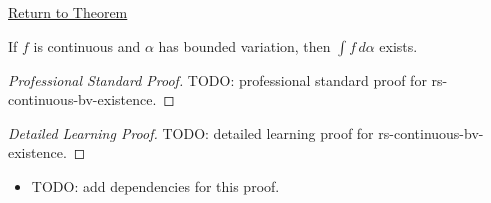 \newpage
{}
\label{prf:rs-continuous-bv-existence}
\begin{remark*}[Return]\hyperref[thm:rs-continuous-bv-existence]{Return to Theorem}\end{remark*}

\begin{theorem*}
If \(f\) is continuous and \(\alpha\) has bounded variation, then \(\int f\,d\alpha\) exists.
\end{theorem*}

\begin{proof}[Professional Standard Proof]
\LRAProofBodyStart
TODO: professional standard proof for rs-continuous-bv-existence.
\end{proof}

\begin{proof}[Detailed Learning Proof]
\LRAProofBodyStart
TODO: detailed learning proof for rs-continuous-bv-existence.
\end{proof}

\begin{remark*}
\end{remark*}

\begin{dependencies}
\begin{itemize}
  \item TODO: add dependencies for this proof.
\end{itemize}
\end{dependencies}

\clearpage
